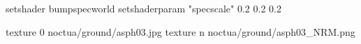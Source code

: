 setshader bumpspecworld
setshaderparam "specscale" 0.2 0.2 0.2

texture 0 noctua/ground/asph03.jpg
texture n noctua/ground/asph03_NRM.png
